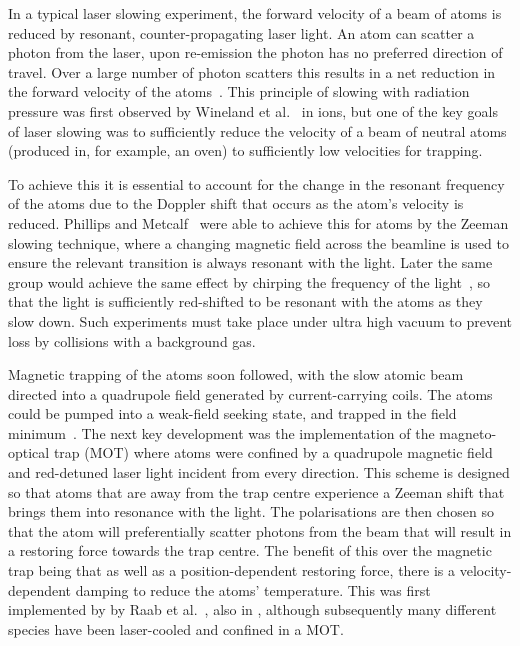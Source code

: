 In a typical laser slowing experiment, the forward velocity of a beam of atoms
is reduced by resonant, counter-propagating laser light. An atom can scatter
a photon from the laser, upon re-emission the photon has no preferred
direction of travel. Over a large number of photon scatters this results in a
net reduction in the forward velocity of the atoms~\cite{PhysRevLett.40.1639}.
This principle of slowing with radiation pressure was first observed by
Wineland et al.~\cite{PhysRevLett.40.1639} in \Mg{} ions, but one of the key
goals of laser slowing was to sufficiently reduce the velocity of a beam of
neutral atoms (produced in, for example, an oven) to sufficiently low
velocities for trapping. 

To achieve this it is essential to account for the change in the resonant
frequency of the atoms due to the Doppler shift that occurs as the atom's
velocity is reduced. Phillips and Metcalf~\cite{PhysRevLett.48.596} were able
to achieve this for \Na{} atoms by the Zeeman slowing technique, where a
changing magnetic field across the beamline is used to ensure the relevant
transition is always resonant with the light. Later the same group would
achieve the same effect by chirping the frequency of the
light~\cite{Prodan1984}, so that the light is sufficiently red-shifted to be
resonant with the atoms as they slow down.  Such experiments must take place
under ultra high vacuum to prevent loss by collisions with a background gas.

Magnetic trapping of the atoms soon followed, with the slow atomic beam
directed into a quadrupole field generated by current-carrying coils. The atoms
could be pumped into a weak-field seeking state, and trapped in the field
minimum~\cite{PhysRevLett.54.2596}. The next key development was the
implementation of the magneto-optical trap (MOT) where atoms were confined by a
quadrupole magnetic field and red-detuned laser light incident from every
direction. This scheme is designed so that atoms that are away from the trap
centre experience a Zeeman shift that brings them into resonance with the
light. The polarisations are then chosen so that the atom will preferentially
scatter photons from the beam that will result in a restoring force towards the
trap centre. The benefit of this over the magnetic trap being that as well as a
position-dependent restoring force, there is a velocity-dependent damping to
reduce the atoms' temperature. This was first implemented by by Raab et
al.~\cite{PhysRevLett.59.2631}, also in \Na{}, although subsequently many
different species have been laser-cooled and confined in a MOT.

